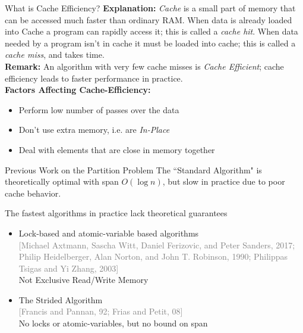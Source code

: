 \documentclass[table,serif,mathserif,final]{beamer}
\newcommand{\citefont}[1]{{\huge \textcolor{gray}{#1}}}
\theoremstyle{remark}
\begin{document}
\begin{frame}{}
\begin{columns}[t]
\begin{column}{0.21\linewidth}
\begin{block}{\Huge What is Cache Efficiency?}
  \justifying
  \Huge
  \textbf{Explanation:} \emph{Cache} is a small part of memory that can be accessed much faster than ordinary RAM. When data is already loaded into Cache a program can rapidly access it; this is called a \emph{cache hit}. When data needed by a program isn't in cache it must be loaded into cache; this is called a \emph{cache miss}, and takes time. \\
  \textbf{Remark:} An algorithm with very few cache misses is \emph{Cache Efficient}; cache efficiency leads to faster performance in practice.\\
  \textbf{Factors Affecting Cache-Efficiency:}
  \begin{itemize}
    \item Perform low number of passes over the data
    \item Don't use extra memory, i.e. are \emph{In-Place}
    \item Deal with elements that are close in memory together
  \end{itemize}
\end{block}
\vspace{0.5cm}

\begin{block}{\Huge Previous Work on the Partition Problem}
  \justifying
  \Huge
  The ``Standard Algorithm" is {\color{blue} theoretically optimal with span $O(\log n)$,} {\color{red} but slow in practice due to poor cache behavior.}

  The {\color{blue}fastest algorithms in practice} {\color{red}lack theoretical guarantees}
  \begin{itemize}
    \item Lock-based and atomic-variable based algorithms\\ \citefont{[Michael Axtmann, Sascha Witt, Daniel Ferizovic, and Peter Sanders, 2017; Philip Heidelberger, Alan Norton, and John T. Robinson, 1990; Philippas Tsigas and Yi Zhang, 2003]}\\
      {\color{red} Not Exclusive Read/Write Memory}
    \item The Strided Algorithm\\ \citefont{[Francis and Pannan, 92; Frias and Petit, 08]}\\ 
      {\color{blue}No locks or atomic-variables,} {\color{red}but no bound on span}
  \end{itemize}
\end{block}
\end{column}


\end{columns}
\end{frame}
\end{document}
